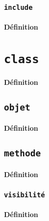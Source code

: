 \documentclass{article}
\begin{document}
\subsubsection{\texttt{include}}
\paragraph{Définition}


\newpage\section{\texttt{class}}
\paragraph{Définition}

\subsection{\texttt{objet}}
\paragraph{Définition}

\subsection{\texttt{methode}}
\paragraph{Définition}

\subsubsection{\texttt{visibilité}}
\paragraph{Définition}
\end{document}
